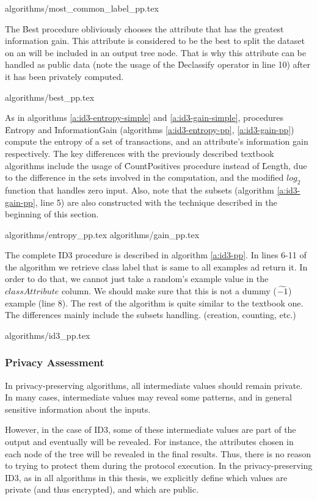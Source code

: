 {algorithms/most_common_label_pp.tex}

The \f{Best} procedure obliviously chooses the attribute that has the greatest information gain.
This attribute is considered to be the best to split the dataset on an will be included in an output tree node.
That is why this attribute can be handled as public data (note the usage of the \f{Declassify} operator in line 10) after it has been privately computed.


{algorithms/best_pp.tex}

As in algorithms \ref{a:id3-entropy-simple} and \ref{a:id3-gain-simple}, procedures \f{Entropy} and \f{InformationGain} (algorithms \ref{a:id3-entropy-pp}, \ref{a:id3-gain-pp}) compute the entropy of a set of transactions, and an attribute's information gain respectively.
The key differences with the previously described textbook algorithms include the usage of \f{CountPositives} procedure instead of \f{Length}, due to the difference in the sets involved in the computation, and the modified $log_2$ function that handles zero input.
Also, note that the subsets (algorithm \ref{a:id3-gain-pp}, line 5) are also constructed with the technique described in the beginning of this section.


{algorithms/entropy_pp.tex}
{algorithms/gain_pp.tex}

The complete \f{ID3} procedure is described in algorithm \ref{a:id3-pp}.
In lines 6-11 of the algorithm we retrieve class label that is same to all examples ad return it.
In order to do that, we cannot just take a random's example value in the $classAttribute$ column.
We should make sure that this is not a dummy ($\widetilde{-1}$) example (line 8).
The rest of the algorithm is quite similar to the textbook one.
The differences mainly include the subsets handling. (creation, counting, etc.)


{algorithms/id3_pp.tex}


\subsubsection{Privacy Assessment}\label{s:id3-privacy-assessment}

In privacy-preserving algorithms, all intermediate values should remain private.
In many cases, intermediate values may reveal some patterns, and in general sensitive information about the inputs.

However, in the case of ID3, some of these intermediate values are part of the output and eventually will be revealed.
For instance, the attributes chosen in each node of the tree will be revealed in the final results.
Thus, there is no reason to trying to protect them during the protocol execution.
In the privacy\hyp preserving ID3, as in all algorithms in this thesis, we explicitly define which values are private (and thus encrypted), and which are public.

